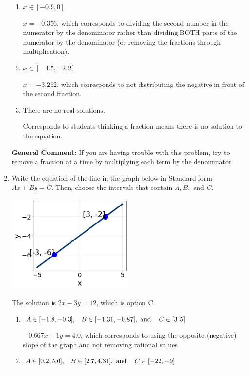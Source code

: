 \documentclass{extbook}[14pt]
\newcommand{\litem}[1]{\item #1

\rule{\textwidth}{0.4pt}}
\begin{document}
\begin{enumerate}
{\begin{enumerate}[label=\Alph*.]
* $x = -1.911$, which is the correct option.
\item \( x \in [-0.9, 0] \)

 $x = -0.356$, which corresponds to dividing the second number in the numerator by the denominator rather than dividing BOTH parts of the numerator by the denominator (or removing the fractions through multiplication).
\item \( x \in [-4.5, -2.2] \)

 $x = -3.252$, which corresponds to not distributing the negative in front of the second fraction.
\item \( \text{There are no real solutions.} \)

Corresponds to students thinking a fraction means there is no solution to the equation.
\end{enumerate}

\textbf{General Comment:} If you are having trouble with this problem, try to remove a fraction at a time by multiplying each term by the denominator.
}
\litem{
Write the equation of the line in the graph below in Standard form $Ax+By=C$. Then, choose the intervals that contain $A, B, \text{ and } C$.

\begin{center}
    \includegraphics[width=0.5\textwidth]{../Figures/linearGraphToStandardCopyB.png}
\end{center}


The solution is \( 2x - 3y = 12 \), which is option C.\begin{enumerate}[label=\Alph*.]
\item \( A \in [-1.8, -0.3], \hspace{3mm} B \in [-1.31, -0.87], \text{ and } \hspace{3mm} C \in [3, 5] \)

 $-0.667x - 1y = 4.0$, which corresponds to using the opposite (negative) slope of the graph and not removing rational values.
\item \( A \in [0.2, 5.6], \hspace{3mm} B \in [2.7, 4.31], \text{ and } \hspace{3mm} C \in [-22, -9] \)


\end{enumerate}}
\end{enumerate}
\end{document}
